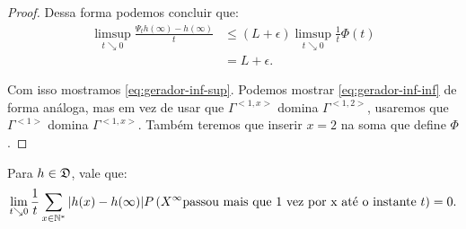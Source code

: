 \begin{proof}
  Dessa forma podemos concluir que:
  \begin{align*}
    \limsup_{t \searrow 0} \frac{\Psi_t h(\infty) - h(\infty)}{t}
    &\leq \left( L + \epsilon \right) \limsup_{t \searrow
      0}\frac{1}{t}  \Phi(t)\\
    &= L + \epsilon.
  \end{align*}


  Com isso mostramos \eqref{eq:gerador-inf-sup}. Podemos mostrar
  \eqref{eq:gerador-inf-inf} de forma análoga, mas em vez de usar que
  $\Gamma^{<1,x>}$ domina $\Gamma^{<1,2>}$, usaremos que
  $\Gamma^{<1>}$ domina $\Gamma^{<1, x>}$. Também teremos que inserir
  $x = 2$ na soma que define $\Phi$.
\end{proof}

\begin{lema}
  \label{lema:gerador-erro}
  Para $h \in {\mathfrak{D}}$, vale que:
  \begin{equation}
    \label{eq:gerador-erro}
    \lim_{t \searrow 0} \frac{1}{t} \sum_{x\in{\mathbb{N^*}}} |h(x) - h(\infty)|
    P\left( X^\infty \text{passou mais que 1 vez por x até o
      instante } t \right) = 0.
  \end{equation}
\end{lema}

